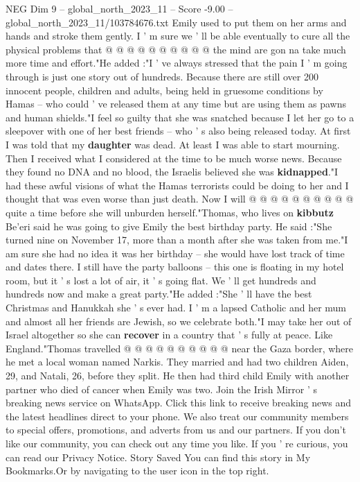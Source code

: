 \begin{textsample}{NEG Dim 9 – global\_north\_2023\_11 – Score -9.00 – global\_north\_2023\_11/103784676.txt}
Emily used to put them on her arms and hands and stroke them gently.
I ' m sure we ' ll be able eventually to cure all the physical problems that @ @ @ @ @ @ @ @ @ @ the mind are gon na take much more time and effort."He added :"I ' ve always stressed that the pain I ' m going through is just one story out of hundreds.
Because there are still over 200 innocent people, children and adults, being held in gruesome conditions by Hamas -- who could ' ve released them at any time but are using them as pawns and human shields."I feel so guilty that she was snatched because I let her go to a sleepover with one of her best friends -- who ' s also being released today.
At first I was told that my \textbf{daughter} was dead.
At least I was able to start mourning.
Then I received what I considered at the time to be much worse news.
Because they found no DNA and no blood, the Israelis believed she was \textbf{kidnapped}."I had these awful visions of what the Hamas terrorists could be doing to her and I thought that was even worse than just death.
Now I will @ @ @ @ @ @ @ @ @ @ quite a time before she will unburden herself."Thomas, who lives on \textbf{kibbutz} Be'eri said he was going to give Emily the best birthday party.
He said :"She turned nine on November 17, more than a month after she was taken from me."I am sure she had no idea it was her birthday -- she would have lost track of time and dates there.
I still have the party balloons -- this one is floating in my hotel room, but it ' s lost a lot of air, it ' s going flat.
We ' ll get hundreds and hundreds now and make a great party."He added :"She ' ll have the best Christmas and Hanukkah she ' s ever had.
I ' m a lapsed Catholic and her mum and almost all her friends are Jewish, so we celebrate both."I may take her out of Israel altogether so she can \textbf{recover} in a country that ' s fully at peace.
Like England."Thomas travelled @ @ @ @ @ @ @ @ @ @ near the Gaza border, where he met a local woman named Narkis.
They married and had two children Aiden, 29, and Natali, 26, before they split.
He then had third child Emily with another partner who died of cancer when Emily was two.
Join the Irish Mirror ' s breaking news service on WhatsApp.
Click this link to receive breaking news and the latest headlines direct to your phone.
We also treat our community members to special offers, promotions, and adverts from us and our partners.
If you don't like our community, you can check out any time you like.
If you ' re curious, you can read our Privacy Notice.
Story Saved You can find this story in My Bookmarks.Or by navigating to the user icon in the top right.

\end{textsample}
